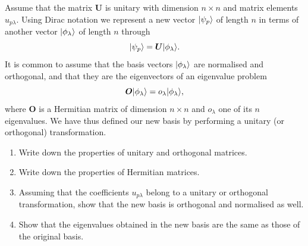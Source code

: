 Assume that the matrix $\bm{U}$ is unitary with dimension $n\times n$ and
matrix elements $u_{p\lambda}$.  Using Dirac notation we represent a new
vector $\vert \psi_p \rangle$ of length $n$ in terms of another vector
$\vert \phi_{\lambda} \rangle$ of length $n$ through
\begin{equation}
  \vert \psi_p \rangle = \bm{U}\vert \phi_{\lambda} \rangle .
  \label{eq:1-w34unitary}
\end{equation}
It is common to assume that the basis vectors $\vert \phi_{\lambda} \rangle$ are
normalised and orthogonal, and that they are the eigenvectors of an eigenvalue
problem
\begin{equation}
  \bm{O}\vert \phi_{\lambda} \rangle = o_{\lambda}\vert \phi_{\lambda} \rangle,
  \label{eq:1-w34eigen}
\end{equation}
where $\bm{O}$ is a Hermitian matrix of dimension $n\times n$ and
$o_{\lambda}$ one of its $n$ eigenvalues.  We have thus defined our new basis
by performing a unitary (or orthogonal) transformation.

\begin{enumerate}
  \item[a)] Write down the properties of unitary and orthogonal matrices.
  \item[b)] Write down the properties of Hermitian matrices.
  \item[c)] Assuming that the coefficients $u_{p\lambda}$ belong to a unitary
        or orthogonal transformation, show that the new basis is orthogonal
        and normalised as well.
  \item[d)] Show that the eigenvalues obtained in the new basis are the same
        as those of the original basis.
\end{enumerate}

